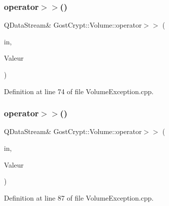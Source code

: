 \subsubsection{\texorpdfstring{operator$>$$>$()}{operator>>()}\hspace{0.1cm}{\footnotesize\ttfamily [5/19]}}
{\footnotesize\ttfamily Q\+Data\+Stream\& Gost\+Crypt\+::\+Volume\+::operator$>$$>$ (\begin{DoxyParamCaption}\item[{Q\+Data\+Stream \&}]{in,  }\item[{\hyperlink{class_gost_crypt_1_1_volume_1_1_cipher_algorithm_not_initialized}{Gost\+Crypt\+::\+Volume\+::\+Cipher\+Algorithm\+Not\+Initialized} \&}]{Valeur }\end{DoxyParamCaption})}



Definition at line 74 of file Volume\+Exception.\+cpp.

\mbox{\label{namespace_gost_crypt_1_1_volume_a18c3ac7cec86d05d0fc01655bf1579fc}} 
\subsubsection{\texorpdfstring{operator$>$$>$()}{operator>>()}\hspace{0.1cm}{\footnotesize\ttfamily [6/19]}}
{\footnotesize\ttfamily Q\+Data\+Stream\& Gost\+Crypt\+::\+Volume\+::operator$>$$>$ (\begin{DoxyParamCaption}\item[{Q\+Data\+Stream \&}]{in,  }\item[{\hyperlink{class_gost_crypt_1_1_volume_1_1_encryption_algorithm_not_initialized}{Gost\+Crypt\+::\+Volume\+::\+Encryption\+Algorithm\+Not\+Initialized} \&}]{Valeur }\end{DoxyParamCaption})}



Definition at line 87 of file Volume\+Exception.\+cpp.

\mbox{\label{namespace_gost_crypt_1_1_volume_a9e496e65f2bd865254ef152f785f736f}} 
